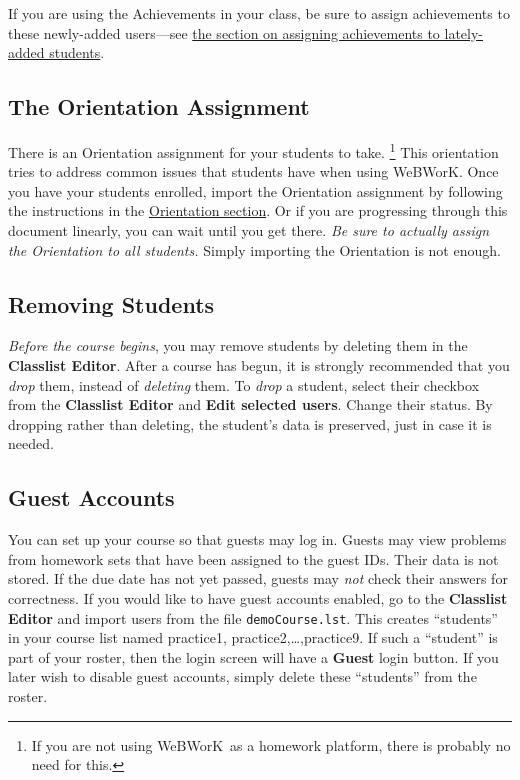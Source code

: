 \documentclass[12pt]{article}
\newcommand{\menu}[1]{\textbf{#1}}
\newcommand{\WW}{WeBWorK}
\begin{document}
If you are using the Achievements in your class, be sure to assign achievements to these newly-added users---see \hyperref[achievementslateaddstudents]{the section on assigning achievements to lately-added students}.

\subsection{The Orientation Assignment}
There is an Orientation assignment for your students to take.
\footnote{If you are not using \WW\ as a homework platform, there is probably no need for this.}
This orientation tries to address common issues that students have when using \WW.
Once you have your students enrolled, import the Orientation assignment by following the instructions in the \hyperref[orientation]{Orientation section}.
Or if you are progressing through this document linearly, you can wait until you get there.
\emph{Be sure to actually assign the Orientation to all students.}
Simply importing the Orientation is not enough.

\subsection{Removing Students}
\emph{Before the course begins}, you may remove students by deleting them in the \menu{Classlist Editor}.
After a course has begun, it is strongly recommended that you \emph{drop} them, instead of \emph{deleting} them.
To \emph{drop} a student, select their checkbox from the \menu{Classlist Editor} and \menu{Edit selected users}.
Change their status.
By dropping rather than deleting, the student's data is preserved, just in case it is needed.

\subsection{Guest Accounts}
You can set up your course so that guests may log in.
Guests may view problems from homework sets that have been assigned to the guest IDs.
Their data is not stored.
If the due date has not yet passed, guests may \emph{not} check their answers for correctness.
If you would like to have guest accounts enabled, go to the \menu{Classlist Editor} and import users from the file \texttt{demoCourse.lst}.
This creates ``students'' in your course list named practice1, practice2,\ldots,practice9.
If such a ``student'' is part of your roster, then the login screen will have a \menu{Guest} login button.
If you later wish to disable guest accounts, simply delete these ``students'' from the roster.
\end{document}
